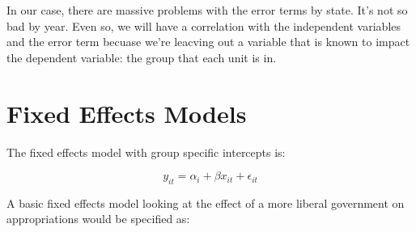 \documentclass[12pt]{article}
\begin{document}
In our case, there are massive problems with the error terms by
state. It's not so bad by year. Even so, we will have a correlation
with the independent variables and the error term becuase we're
leacving out a variable that is known to impact the dependent
variable: the group that each unit is in. 

\section{Fixed Effects Models}


The fixed effects model with group specific intercepts is: 

\begin{equation*}
  \label{eq:ols}
  y_{it}=\alpha_i+ \beta x_{it} + \epsilon_{it}
\end{equation*}


A basic fixed effects model looking at the effect of a more liberal
government on appropriations would be specified as:
\end{document}
